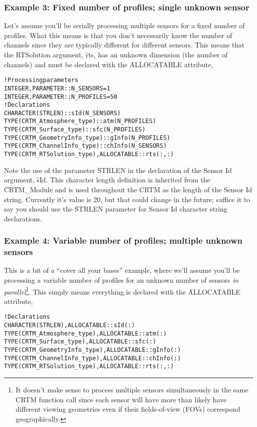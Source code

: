\subsubsection{Example 3: Fixed number of profiles; single unknown sensor}
\label{sec:declare_ex_fpsus}
Let's assume you'll be serially processing multiple sensors for a fixed number of profiles. What this means is that you don't necessarily know the number of channels since they are typically different for different sensors. This means that the RTSolution argument, \f{rts}, has an unknown dimension (the number of channels) and must be declared with the \f{ALLOCATABLE} attribute,
\begin{alltt}
  ! Processing parameters
  INTEGER, PARAMETER :: N_SENSORS  =  1
  INTEGER, PARAMETER :: N_PROFILES = 50
  ! Declarations
  CHARACTER(STRLEN)                       :: sId(N_SENSORS)
  TYPE(CRTM_Atmosphere_type)              :: atm(N_PROFILES)
  TYPE(CRTM_Surface_type)                 :: sfc(N_PROFILES)
  TYPE(CRTM_GeometryInfo_type)            :: gInfo(N_PROFILES)
  TYPE(CRTM_ChannelInfo_type)             :: chInfo(N_SENSORS)
  TYPE(CRTM_RTSolution_type), ALLOCATABLE :: rts(:,:)\end{alltt}

Note the use of the parameter \f{STRLEN} in the declaration of the Sensor Id argument, \f{sId}. This character length definition is inherited from the \f{CRTM\_Module} and is used throughout the CRTM as the length of the Sensor Id string. Currently it's value is 20, but that could change in the future; suffice it to say you should use the \f{STRLEN} parameter for Sensor Id character string declarations. 

\subsubsection{Example 4: Variable number of profiles; multiple unknown sensors}
\label{sec:declare_ex_vpmus}
This is a bit of a ``cover all your bases'' example, where we'll assume you'll be processing a variable number of profiles for an unknown number of sensors \textit{in parallel}\footnote{It doesn't make sense to process multiple sensors simultaneously in the same CRTM function call since each sensor will have more than likely have different viewing geometries even if their fields-of-view (FOVs) correspond geographically.}. This simply means everything is declared with the \f{ALLOCATABLE} attribute,
\begin{ttfamily}
  \begin{alltt}
  ! Declarations
  CHARACTER(STRLEN)           , ALLOCATABLE :: sId(:)
  TYPE(CRTM_Atmosphere_type)  , ALLOCATABLE :: atm(:)
  TYPE(CRTM_Surface_type)     , ALLOCATABLE :: sfc(:)
  TYPE(CRTM_GeometryInfo_type), ALLOCATABLE :: gInfo(:)  
  TYPE(CRTM_ChannelInfo_type) , ALLOCATABLE :: chInfo(:)
  TYPE(CRTM_RTSolution_type)  , ALLOCATABLE :: rts(:,:)\end{alltt}
\end{ttfamily}




